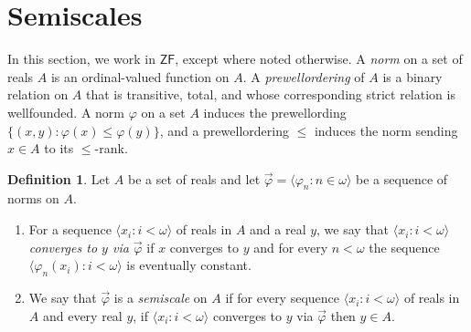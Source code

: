 \documentclass[fleqn, 11pt]{amsart}
\theoremstyle{plain}
\theoremstyle{definition}
\newtheorem{defn}[thm]{Definition} \newtheorem*{defn*}{Definition}
\theoremstyle{remark}
\newcommand{\powerset}{\mathcal{P}}
\begin{document}
\section{Semiscales}\label{semiscalesec}



In this section, we work in $\mathsf{ZF}$, except where noted otherwise. A \emph{norm} on a set of reals $A$ is an ordinal-valued function on $A$. A \emph{prewellordering} of $A$ is a binary relation on $A$ that is transitive, total, and whose corresponding strict relation is wellfounded. A norm $\varphi$ on a set $A$ induces the prewellording $\{ (x,y) : \varphi(x) \leq \varphi(y)\}$, and a prewellordering $\leq$ induces the norm sending $x \in A$ to its $\leq$-rank. 

\begin{defn}\label{convssdef}
 Let $A$ be a set of reals and let $\vec{\varphi} = \langle \varphi_n : n \in \omega\rangle$ be a sequence of norms on $A$.
\begin{enumerate}
 \item For a sequence $\langle x_i : i < \omega \rangle$ of reals in $A$ and a real $y$,  we say that $\langle x_i : i < \omega\rangle$ \emph{converges to $y$ via $\vec{\varphi}$} if $x$ converges to $y$ and for every $n < \omega$ the sequence $\langle \varphi_n(x_i) : i < \omega\rangle$ is eventually constant.

 \item\label{semiscaleitem} We say that $\vec{\varphi}$ is a \emph{semiscale} on $A$ if
 for every sequence $\langle x_i : i < \omega\rangle$ of reals in $A$ and every real $y$, if $\langle x_i : i < \omega\rangle$ converges to $y$ via $\vec{\varphi}$ then $y \in A$. 
\end{enumerate}
\end{defn}
\end{document}
